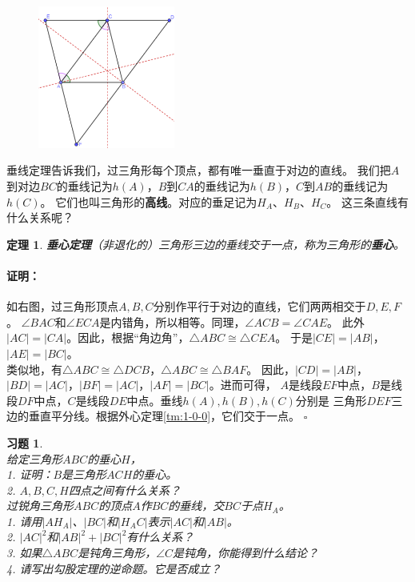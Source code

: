 \documentclass[12pt,UTF8]{ctexbook}
\newtheorem{tm}{定理}[section]
\newenvironment{proof2}{\paragraph{\textbf{证明：}}}{\hfill$\square$}
\newtheorem{xt}{习题}[section]
\begin{document}
\begin{figure} %
    \vspace{-45pt}
    \flushright
    \includegraphics[width=0.4\textwidth]{tu/三角形7.png}
\end{figure}

垂线定理告诉我们，过三角形每个顶点，都有唯一垂直于对边的直线。
我们把$A$到对边$BC$的垂线记为$h(A)$，$B$到$CA$的垂线记为$h(B)$，$C$到$AB$的垂线记为$h(C)$。
它们也叫三角形的\textbf{高线}。对应的垂足记为$H_A$、$H_B$、$H_C$。
这三条直线有什么关系呢？

\begin{tm}{\textbf{垂心定理}}\label{tm:1-1-0}
    （非退化的）三角形三边的垂线交于一点，称为三角形的\textbf{垂心}。
\end{tm}

\begin{proof2}
    如右图，过三角形顶点$A,B,C$分别作平行于对边的直线，它们两两相交于$D,E,F$。
    $\angle BAC$和$\angle ECA$是内错角，所以相等。同理，$\angle ACB = \angle CAE$。
    此外$|AC| = |CA|$。因此，根据“角边角”，$\triangle ABC \cong \triangle CEA$。
    于是$|CE| = |AB|$，$|AE| = |BC|$。\\
    类似地，有$\triangle ABC \cong \triangle DCB$，$\triangle ABC \cong \triangle BAF$。
    因此，$|CD| = |AB|$，$|BD| = |AC|$，$|BF| = |AC|$，$|AF| = |BC|$。进而可得，
    $A$是线段$EF$中点，$B$是线段$DF$中点，$C$是线段$DE$中点。垂线$h(A), h(B), h(C)$分别是
    三角形$DEF$三边的垂直平分线。根据外心定理\ref{tm:1-0-0}，它们交于一点。
\end{proof2}
\begin{xt}\label{xt:1-1-0}
    \mbox{}\\
    给定三角形$ABC$的垂心$H$，\\
    1. 证明：$B$是三角形$ACH$的垂心。\\
    2. $A,B,C,H$四点之间有什么关系？\\
    过锐角三角形$ABC$的顶点$A$作$BC$的垂线，交$BC$于点$H_A$。\\
    1. 请用$|AH_A|$、$|BC|$和$|H_AC|$表示$|AC|$和$|AB|$。\\
    2. $|AC|^2$和$|AB|^2 + |BC|^2$有什么关系？\\
    3. 如果$\triangle ABC$是钝角三角形，$\angle C$是钝角，你能得到什么结论？\\
    4. 请写出勾股定理的逆命题。它是否成立？
\end{xt}
\end{document}
